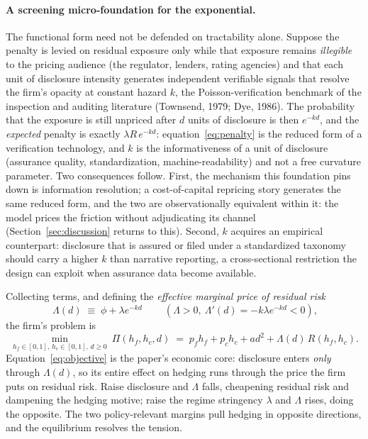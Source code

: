 \documentclass[11pt,a4paper]{article}
\begin{document}
\paragraph{A screening micro-foundation for the exponential.}
The functional form need not be defended on tractability alone. Suppose the penalty is levied on residual exposure only while that exposure remains \emph{illegible} to the pricing audience (the regulator, lenders, rating agencies) and that each unit of disclosure intensity generates independent verifiable signals that resolve the firm's opacity at constant hazard $k$, the Poisson-verification benchmark of the inspection and auditing literature (Townsend, 1979; Dye, 1986). The probability that the exposure is still unpriced after $d$ units of disclosure is then $e^{-kd}$, and the \emph{expected} penalty is exactly $\lambda R\,e^{-kd}$: equation~\eqref{eq:penalty} is the reduced form of a verification technology, and $k$ is the informativeness of a unit of disclosure (assurance quality, standardization, machine-readability) and not a free curvature parameter. Two consequences follow. First, the mechanism this foundation pins down is information resolution; a cost-of-capital repricing story generates the same reduced form, and the two are observationally equivalent within it: the model prices the friction without adjudicating its channel (Section~\ref{sec:discussion} returns to this). Second, $k$ acquires an empirical counterpart: disclosure that is assured or filed under a standardized taxonomy should carry a higher $k$ than narrative reporting, a cross-sectional restriction the design can exploit when assurance data become available.

Collecting terms, and defining the \emph{effective marginal price of residual risk}
\begin{equation}
\boxed{\ \Lambda(d)\;\equiv\;\phi+\lambda e^{-kd}\ }\qquad(\Lambda>0,\ \Lambda'(d)=-k\lambda e^{-kd}<0),
\label{eq:Lambda}
\end{equation}
the firm's problem is
\begin{equation}
\min_{h_f\in[0,1],\,h_c\in[0,1],\,d\ge0}\ \Pi(h_f,h_c,d)\;=\;p_f h_f+p_c h_c+a d^2+\Lambda(d)\,R(h_f,h_c).
\label{eq:objective}
\end{equation}
Equation~\eqref{eq:objective} is the paper's economic core: disclosure enters \emph{only} through $\Lambda(d)$, so its entire effect on hedging runs through the price the firm puts on residual risk. Raise disclosure and $\Lambda$ falls, cheapening residual risk and dampening the hedging motive; raise the regime stringency $\lambda$ and $\Lambda$ rises, doing the opposite. The two policy-relevant margins pull hedging in opposite directions, and the equilibrium resolves the tension.
\end{document}
